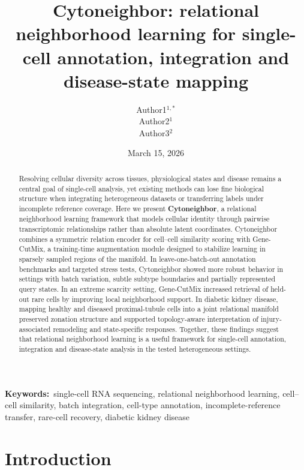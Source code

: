 \documentclass[11pt]{article}
\newcommand{\keywords}[1]{\par\vspace{6pt}
  \noindent\textbf{Keywords:}\ #1\par
}
\begin{document}
\title{Cytoneighbor: relational neighborhood learning for single-cell annotation, integration and disease-state mapping}

\author{Author1$^{1, \ast}$\\
    Author2$^{1}$ \\
    Author3$^{2}$
}
\date{March 15, 2026}

\maketitle

\begin{abstract}
Resolving cellular diversity across tissues, physiological states and disease remains a central goal of single-cell analysis, yet existing methods can lose fine biological structure when integrating heterogeneous datasets or transferring labels under incomplete reference coverage. Here we present \textbf{Cytoneighbor}, a relational neighborhood learning framework that models cellular identity through pairwise transcriptomic relationships rather than absolute latent coordinates. Cytoneighbor combines a symmetric relation encoder for cell--cell similarity scoring with Gene-CutMix, a training-time augmentation module designed to stabilize learning in sparsely sampled regions of the manifold. In leave-one-batch-out annotation benchmarks and targeted stress tests, Cytoneighbor showed more robust behavior in settings with batch variation, subtle subtype boundaries and partially represented query states. In an extreme scarcity setting, Gene-CutMix increased retrieval of held-out rare cells by improving local neighborhood support. In diabetic kidney disease, mapping healthy and diseased proximal-tubule cells into a joint relational manifold preserved zonation structure and supported topology-aware interpretation of injury-associated remodeling and state-specific responses. Together, these findings suggest that relational neighborhood learning is a useful framework for single-cell annotation, integration and disease-state analysis in the tested heterogeneous settings.
\end{abstract}


\keywords{single-cell RNA sequencing, relational neighborhood learning, cell--cell similarity, batch integration, cell-type annotation, incomplete-reference transfer, rare-cell recovery, diabetic kidney disease}



\section{Introduction}
\end{document}
